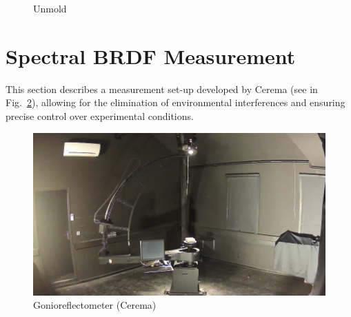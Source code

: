 \begin{figure}[!tb]
    \centering
    \hfil
    \caption{Unmold}
    \label{fig:unmould}
\end{figure}

\section{Spectral BRDF Measurement}

This section describes a measurement set-up developed by Cerema (see in Fig.~\ref{fig:gonio}), allowing for the elimination of environmental interferences and ensuring precise control over experimental conditions.

\begin{figure}[!tb]
    \centering
    \includegraphics[width=0.9\linewidth]{./figures/optical-properties-of-road-surface/gonio-new.png}
    \caption{Gonioreflectometer (Cerema)}
    \label{fig:gonio}
\end{figure}

